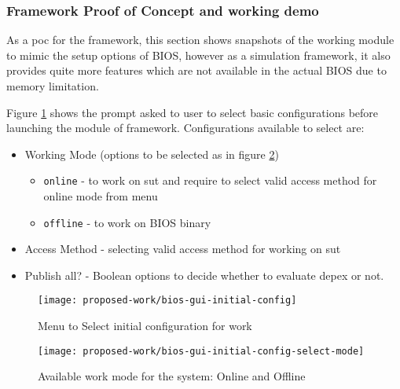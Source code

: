 \subsubsection{Framework Proof of Concept and working demo}
As a \gls{poc} for the framework, this section shows snapshots of the working module to mimic the setup options of BIOS, however as a simulation framework, it also provides quite more features which are not available in the actual BIOS due to memory limitation.

Figure \ref{fig:proposed-work-bios-gui-initial-config} shows the prompt asked to user to select basic configurations before launching the module of framework. Configurations available to select are:

\begin{itemize}
	\item Working Mode (options to be selected as in figure \ref{fig:proposed-work-bios-gui-initial-config-select-mode})
	\begin{itemize}
		\item \verb|online| - to work on \gls{sut} and require to select valid access method for online mode from menu
		\item \verb|offline| - to work on BIOS binary
	\end{itemize}
	\item Access Method - selecting valid access method for working on \gls{sut}
	\item Publish all? - Boolean options to decide whether to evaluate \gls{depex} or not. 
\end{itemize}

\begin{figure}[!htbp]
	\centering
	\texttt{[image: proposed-work/bios-gui-initial-config]}
	\caption{Menu to Select initial configuration for work}\label{fig:proposed-work-bios-gui-initial-config}
\end{figure}

\begin{figure}[!htbp]
	\centering
	\texttt{[image: proposed-work/bios-gui-initial-config-select-mode]}
	\caption{Available work mode for the system: Online and Offline}\label{fig:proposed-work-bios-gui-initial-config-select-mode}
\end{figure}



